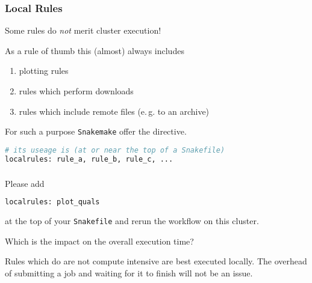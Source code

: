 \begin{frame}[fragile]
  \frametitle{Local Rules}
  \begin{hint}[]
  	Some rules do \emph{not} merit cluster execution!
  \end{hint}
  \pause
  As a rule of thumb this (almost) always includes
  \begin{enumerate}
   \item plotting rules
   \item rules which perform downloads
   \item rules which include remote files (e.\,g. to an archive)
  \end{enumerate}
  \pause
  For such a purpose \texttt{Snakemake} offer the  directive.
  \begin{lstlisting}[language=Python,style=Python]
# its useage is (at or near the top of a Snakefile)
localrules: rule_a, rule_b, rule_c, ...
  \end{lstlisting}

\end{frame}

\begin{frame}[fragile]
  \frametitle{}
  Please add
  \begin{lstlisting}[language=Python,style=Python]
localrules: plot_quals
  \end{lstlisting}
  at the top of your \texttt{Snakefile} and rerun the workflow on this cluster.
  \pause
  \begin{question}
  	Which is the impact on the overall execution time?
  \end{question}
  \pause
  \begin{hint}
  	Rules which do are not compute intensive are best executed locally. The overhead of submitting a job and waiting for it to finish will not be an issue.
  \end{hint}
\end{frame}

